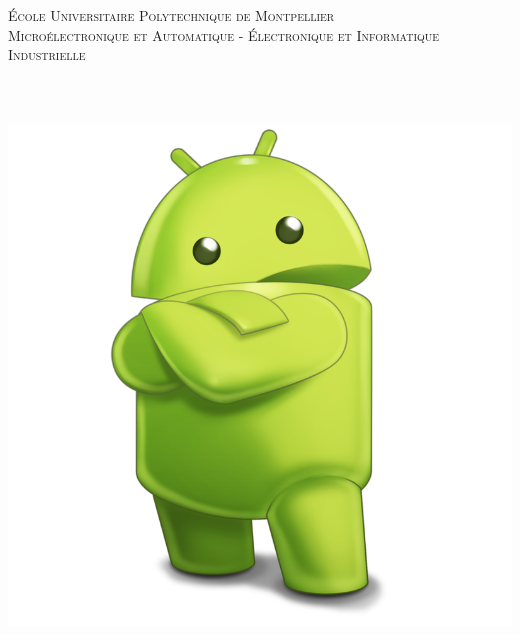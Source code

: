 \makeatletter
  \begin{titlepage}
  \centering
      {\Large \textsc{École Universitaire Polytechnique de Montpellier}}\\
      \textsc{Microélectronique et Automatique - Électronique et Informatique Industrielle }\\
    \noindent\hrulefill 
    \\
    \vspace{2 cm}
      {\large	\@date\\}
    \vspace{2cm}
       {\huge \textbf{\@title}} \\
	
	\vspace{1cm}
      \includegraphics[scale=0.15]{head.png}\\

    \vspace{2em}
        {\large \@author} \\
    

\end{titlepage}
